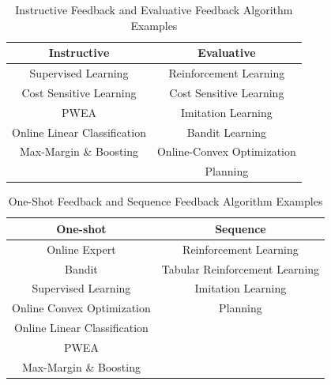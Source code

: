 \documentclass[11pt]{article}
\begin{document}
\begin{center}
\begin{table} [H]
\begin{center}
\begin{tabular}{||c | c||} 
 \hline
 Instructive & Evaluative  \\ [0.5ex] 
 \hline\hline
 Supervised Learning & Reinforcement Learning \\ 
 \hline
 Cost Sensitive Learning & Cost Sensitive Learning \\
 \hline
 PWEA & Imitation Learning \\
 \hline
 Online Linear Classification & Bandit Learning \\
 \hline
 Max-Margin \& Boosting & Online-Convex Optimization \\
 \hline
  & Planning \\ [1ex] 
 \hline
\end{tabular}
\caption{\label{tab:ins_ev_ex}Instructive Feedback and Evaluative Feedback Algorithm Examples}
\end{center}
\end{table}
\end{center}

\begin{center}
\begin{table} [H]
\begin{center}
\begin{tabular}{||c | c||} 
 \hline
 One-shot & Sequence  \\ [0.5ex] 
 \hline\hline
 Online Expert & Reinforcement Learning \\ 
 \hline
 Bandit & Tabular Reinforcement Learning \\
 \hline
 Supervised Learning & Imitation Learning \\
 \hline
 Online Convex Optimization & Planning \\
 \hline
 Online Linear Classification &  \\
 \hline
 PWEA &  \\
 \hline
 Max-Margin \& Boosting &  \\ [1ex] 
 \hline
\end{tabular}
\caption{\label{tab:one_seq_ex}One-Shot Feedback and Sequence Feedback Algorithm Examples}
\end{center}
\end{table}
\end{center}
 
\end{document}
